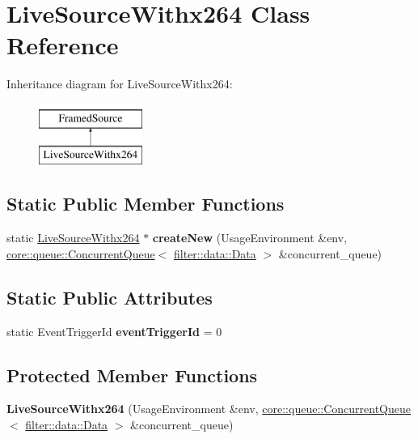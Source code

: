 \hypertarget{class_live_source_withx264}{}\section{Live\+Source\+Withx264 Class Reference}
\label{class_live_source_withx264}
Inheritance diagram for Live\+Source\+Withx264\+:\begin{figure}[H]
\begin{center}
\leavevmode
\includegraphics[height=2.000000cm]{dd/d5c/class_live_source_withx264}
\end{center}
\end{figure}
\subsection*{Static Public Member Functions}
\begin{DoxyCompactItemize}
\item 
\mbox{\label{class_live_source_withx264_a205b161d7116e4b95df4f2156201b600}} 
static \hyperlink{class_live_source_withx264}{Live\+Source\+Withx264} $\ast$ {\bfseries create\+New} (Usage\+Environment \&env, \hyperlink{classcore_1_1queue_1_1_concurrent_queue}{core\+::queue\+::\+Concurrent\+Queue}$<$ \hyperlink{classfilter_1_1data_1_1_data}{filter\+::data\+::\+Data} $>$ \&concurrent\+\_\+queue)
\end{DoxyCompactItemize}
\subsection*{Static Public Attributes}
\begin{DoxyCompactItemize}
\item 
\mbox{\label{class_live_source_withx264_a1f61321efc4abcc9151e02de5b0f77f7}} 
static Event\+Trigger\+Id {\bfseries event\+Trigger\+Id} = 0
\end{DoxyCompactItemize}
\subsection*{Protected Member Functions}
\begin{DoxyCompactItemize}
\item 
\mbox{\label{class_live_source_withx264_a97840bac6a3828cc5f479c886a08980d}} 
{\bfseries Live\+Source\+Withx264} (Usage\+Environment \&env, \hyperlink{classcore_1_1queue_1_1_concurrent_queue}{core\+::queue\+::\+Concurrent\+Queue}$<$ \hyperlink{classfilter_1_1data_1_1_data}{filter\+::data\+::\+Data} $>$ \&concurrent\+\_\+queue)
\end{DoxyCompactItemize}
